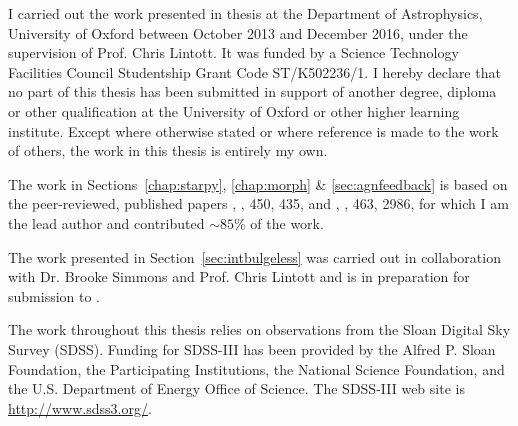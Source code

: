 \documentclass[12pt,useAMS]{ociamthesis}  %
\def\minor		{\color{minorcol}}
\begin{document}
\begin{originalitylong}
I carried out the work presented in thesis at the Department of Astrophysics, University of Oxford between October 2013 and December 2016, under the supervision of Prof. Chris Lintott. It was funded by a Science Technology Facilities Council Studentship Grant Code ST/K502236/1. I hereby declare that no part of this thesis has been submitted in support of another degree, diploma or other qualification at the University of Oxford or other higher learning institute. Except where otherwise stated or where reference is made to the work of others, the work in this thesis is entirely my own.

The work in Sections~\ref{chap:starpy}, \ref{chap:morph} \& \ref{sec:agnfeedback} is based on the peer-reviewed, published papers \citealt{smethurst15}, \mnras, 450, 435, and \citealt{smethurst16}, \mnras, 463, 2986, for which I am the lead author {\minor and contributed $\sim85\%$ of the work}. 

The work presented in Section~\ref{sec:intbulgeless} was carried out in collaboration with Dr. Brooke Simmons and Prof. Chris Lintott and is in preparation for submission to \mnras.

The work throughout this thesis relies on observations from the Sloan Digital Sky Survey (SDSS). Funding for SDSS-III has been provided by the Alfred P. Sloan Foundation, the Participating Institutions, the National Science Foundation, and the U.S. Department of Energy Office of Science. The SDSS-III web site is \url{http://www.sdss3.org/}.



\end{originalitylong}
\end{document}
